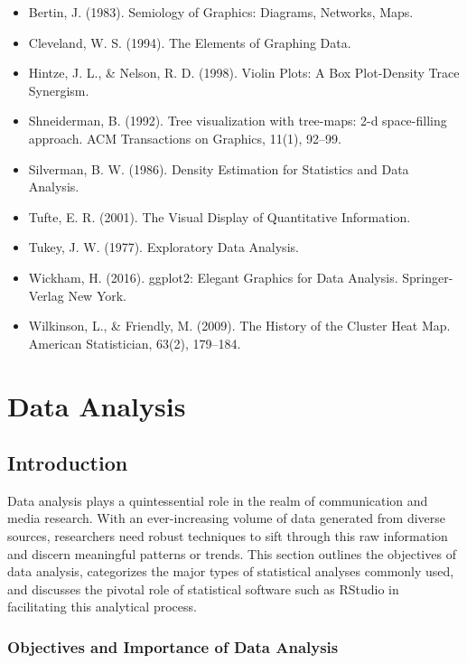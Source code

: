 \documentclass[
  b5paper]{book}
\providecommand{\tightlist}{%
  \setlength{\itemsep}{0pt}\setlength{\parskip}{0pt}}
\begin{document}
\begin{itemize}
\tightlist
\item
  Bertin, J. (1983). Semiology of Graphics: Diagrams, Networks, Maps.
\item
  Cleveland, W. S. (1994). The Elements of Graphing Data.
\item
  Hintze, J. L., \& Nelson, R. D. (1998). Violin Plots: A Box Plot-Density Trace Synergism.
\item
  Shneiderman, B. (1992). Tree visualization with tree-maps: 2-d space-filling approach. ACM Transactions on Graphics, 11(1), 92--99.
\item
  Silverman, B. W. (1986). Density Estimation for Statistics and Data Analysis.
\item
  Tufte, E. R. (2001). The Visual Display of Quantitative Information.
\item
  Tukey, J. W. (1977). Exploratory Data Analysis.
\item
  Wickham, H. (2016). ggplot2: Elegant Graphics for Data Analysis. Springer-Verlag New York.
\item
  Wilkinson, L., \& Friendly, M. (2009). The History of the Cluster Heat Map. American Statistician, 63(2), 179--184.
\end{itemize}

\hypertarget{data-analysis}{%
\chapter{Data Analysis}\label{data-analysis}}

\hypertarget{introduction-7}{%
\section{Introduction}\label{introduction-7}}

Data analysis plays a quintessential role in the realm of communication and media research. With an ever-increasing volume of data generated from diverse sources, researchers need robust techniques to sift through this raw information and discern meaningful patterns or trends. This section outlines the objectives of data analysis, categorizes the major types of statistical analyses commonly used, and discusses the pivotal role of statistical software such as RStudio in facilitating this analytical process.

\hypertarget{objectives-and-importance-of-data-analysis}{%
\subsection*{Objectives and Importance of Data Analysis}\label{objectives-and-importance-of-data-analysis}}
\end{document}
